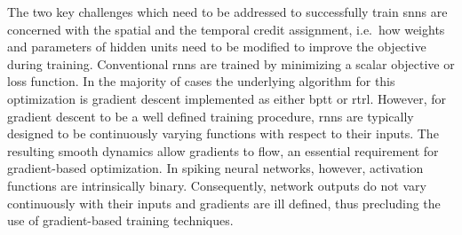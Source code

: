 \documentclass[journal,onecolumn,11pt]{IEEEtran}
\begin{document}
The two key challenges which need to be addressed to successfully train \glspl{snn} are concerned with the spatial and the temporal credit assignment,
i.e.\ how weights and parameters of hidden units need to be modified to improve the objective during training.  
Conventional \glspl{rnn} are trained by minimizing a scalar objective or loss function. 
In the majority of cases the underlying algorithm for this optimization is gradient descent implemented as either \gls{bptt} or
\gls{rtrl}.
However, for gradient descent to be a well defined training procedure, \glspl{rnn} are typically designed to be continuously varying functions with
respect to their inputs. 
The resulting smooth dynamics allow gradients to flow, %
an essential requirement for gradient-based optimization. 
In spiking neural networks, however, activation functions are intrinsically
binary. 
Consequently, network outputs do not vary continuously with their inputs and gradients are ill defined, 
thus precluding the use of gradient-based training techniques. 
\end{document}

